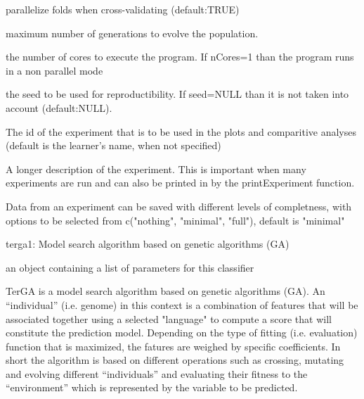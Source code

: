 \documentclass[a4paper]{book}
\begin{document}
\begin{Arguments}
\begin{ldescription}
\item[\code{parallelize.folds:}] parallelize folds when cross-validating (default:TRUE)

\item[\code{nb\_generations:}] maximum number of generations to evolve the population.

\item[\code{nCores:}] the number of cores to execute the program. If nCores=1 than the program runs in a non parallel mode

\item[\code{seed:}] the seed to be used for reproductibility. If seed=NULL than it is not taken into account (default:NULL).

\item[\code{experiment.id:}] The id of the experiment that is to be used in the plots and comparitive analyses (default is the learner's name, when not specified)

\item[\code{experiment.description:}] A longer description of the experiment. This is important when many experiments are run and can also be printed in by the printExperiment function.

\item[\code{experiment.save:}] Data from an experiment can be saved with different levels of completness, with options to be selected from c("nothing", "minimal", "full"), default is "minimal"
\end{ldescription}
\end{Arguments}
%
\begin{Details}
terga1: Model search algorithm based on genetic algorithms (GA)
\end{Details}
%
\begin{Value}
an object containing a list of parameters for this classifier
\end{Value}
%
\begin{Description}
TerGA is a model search algorithm based on genetic algorithms (GA). 
An “individual” (i.e. genome) in this context is a combination of features that 
will be associated together using a selected "language" to compute a score that 
will constitute the prediction model. Depending on the type of fitting (i.e. evaluation)
function that is maximized, the fatures are weighed by specific coefficients. 
In short the algorithm is based on different operations such as crossing, mutating 
and evolving different “individuals” and evaluating their fitness to the “environment” 
which is represented by the variable to be predicted.
\end{Description}
\end{document}
